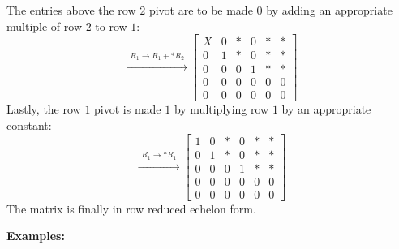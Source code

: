 \documentclass{article}
\begin{document}
The entries above the row \(2\) pivot are to be made \(0\) by adding an appropriate multiple of row \(2\) to row \(1\):
\[\xrightarrow{\begin{array}{c} R_1 \rightarrow R_1 + *R_2 \end{array}} \left[\begin{array}{ccccc|c}
X & 0 & * & 0 & * & * \\
0 & 1 & * & 0 & * & * \\
0 & 0 & 0 & 1 & * & * \\
0 & 0 & 0 & 0 & 0 & 0 \\
0 & 0 & 0 & 0 & 0 & 0 
\end{array}\right]\]
Lastly, the row \(1\) pivot is made \(1\) by multiplying row \(1\) by an appropriate constant:
\[\xrightarrow{\begin{array}{c} R_1 \rightarrow *R_1 \end{array}} \left[\begin{array}{ccccc|c}
1 & 0 & * & 0 & * & * \\
0 & 1 & * & 0 & * & * \\
0 & 0 & 0 & 1 & * & * \\
0 & 0 & 0 & 0 & 0 & 0 \\
0 & 0 & 0 & 0 & 0 & 0 
\end{array}\right]\]
The matrix is finally in row reduced echelon form.


\textbf{Examples:}
\end{document}
